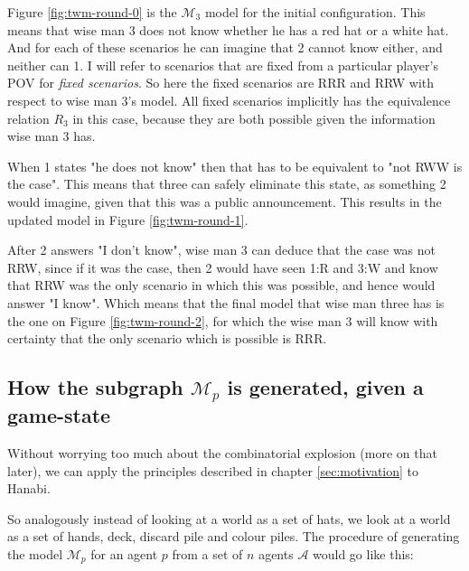 Figure \ref{fig:twm-round-0} is the $\mathcal{M}_{3}$ model for the initial configuration. This means that wise man 3 does not know whether he has a red hat or a white hat. And for each of these scenarios he can imagine that 2 cannot know either, and neither can 1. I will refer to scenarios that are fixed from a particular player's POV for \emph{fixed scenarios}. So here the fixed scenarios are RRR and RRW with respect to wise man 3's model. All fixed scenarios implicitly has the equivalence relation $R_3$ in this case, because they are both possible given the information wise man 3 has.

When 1 states "he does not know" then that has to be equivalent to "not RWW is the case". This means that three can safely eliminate this state, as something 2 would imagine, given that this was a public announcement. This results in the updated model in Figure \ref{fig:twm-round-1}.

After 2 answers "I don't know", wise man 3 can deduce that the case was not RRW, since if it was the case, then 2 would have seen 1:R and 3:W and know that RRW was the only scenario in which this was possible, and hence would answer "I know". Which means that the final model that wise man three has is the one on Figure \ref{fig:twm-round-2}, for which the wise man 3 will know with certainty that the only scenario which is possible is RRR.



\subsection{How the subgraph $\mathcal{M}_p$ is generated, given a game-state} \label{sec:description-of-how-modal-logic-is_applied}
Without worrying too much about the combinatorial explosion (more on that later), we can apply the principles described in chapter \ref{sec:motivation} to Hanabi. 

So analogously instead of looking at a world as a set of hats, we look at a world as a set of hands, deck, discard pile and colour piles. 
The procedure of generating the model $\mathcal{M}_p$ for an agent $p$ from a set of $n$ agents $\mathcal{A}$ would go like this:

